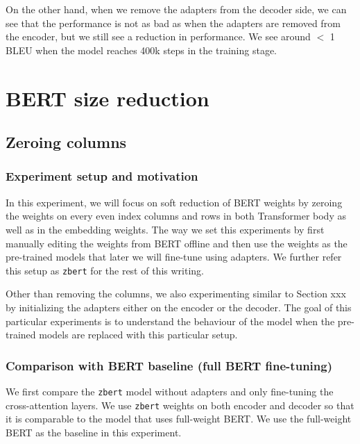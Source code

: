 On the other hand, when we remove the adapters from the decoder side, we can see that the performance is not as bad as when the adapters are removed from the encoder, but we still see a reduction in performance. We see around $<$ 1 BLEU when the model reaches 400k steps in the training stage.

\section{BERT size reduction}
\subsection{Zeroing columns}
\subsubsection{Experiment setup and motivation}
In this experiment, we will focus on soft reduction of BERT weights by zeroing the weights on every even index columns and rows in both Transformer body as well as in the embedding weights. The way we set this experiments by first manually editing the weights from BERT offline and then use the weights as the pre-trained models that later we will fine-tune using adapters. We further refer this setup as \texttt{zbert} for the rest of this writing.

Other than removing the columns, we also experimenting similar to Section xxx by initializing the adapters either on the encoder or the decoder. The goal of this particular experiments is to understand the behaviour of the model when the pre-trained models are replaced with this particular setup.

\subsubsection{Comparison with BERT baseline (full BERT fine-tuning)}
We first compare the \texttt{zbert} model without adapters and only fine-tuning the cross-attention layers. We use \texttt{zbert} weights on both encoder and decoder so that it is comparable to the model that uses full-weight BERT. We use the full-weight BERT as the baseline in this experiment.


